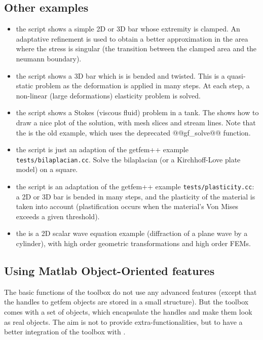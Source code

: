 \subsection{Other examples}
\begin{itemize}
\item the  script shows a
  simple 2D or 3D bar whose extremity is clamped. An adaptative
  refinement is used to obtain a better approximation in the area
  where the stress is singular (the transition between the clamped
  area and the neumann boundary).

\item the  script shows a 3D bar which is is bended and twisted. This is a quasi-static problem as the deformation is applied in many steps. At each step, a non-linear (large deformations) elasticity problem is solved.

\item the  script shows a Stokes (viscous fluid) problem in a tank. The  shows how to draw a nice plot of the solution, with mesh slices and stream lines. Note that the  is the old example, which uses the deprecated @@gf_solve@@ function.

\item the  script is just an adaption of the getfem++ example \texttt{tests/bilaplacian.cc}. Solve the bilaplacian (or a Kirchhoff-Love plate model) on a square.

\item the  script is an adaptation of the getfem++ example \texttt{tests/plasticity.cc}: a 2D or 3D bar is bended in many steps, and the plasticity of the material is taken into account (plastification occurs when the material's Von Mises exceeds a given threshold).

\item the  is a 2D scalar wave equation example (diffraction of a plane wave by a cylinder), with high order geometric transformations and high order FEMs.
\end{itemize}


\subsection{Using Matlab Object-Oriented features}
The basic functions of the \gfm toolbox do not use any advanced \mlab features
(except that the handles to getfem objects are stored in a small \mlab
structure). But the toolbox comes with a set of \Mlab objects, which
encapsulate the handles and make them look as real \mlab objects. The aim is
not to provide extra-functionalities, but to have a better integration of the
toolbox with \mlab.

